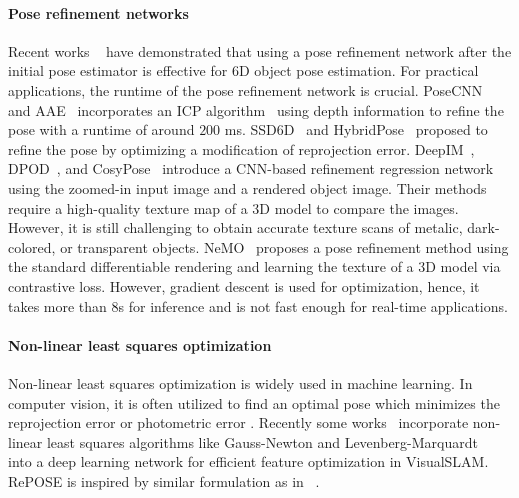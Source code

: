 \documentclass[10pt,twocolumn,letterpaper]{article}
\begin{document}
\paragraph{Pose refinement networks}
Recent works ~\cite{xiang2018posecnn,Sundermeyer_2018_ECCV,Zakharov_2019_ICCV,Song_2020_CVPR,li2018deepim} have demonstrated that using a pose refinement network after the initial pose estimator is effective for 6D object pose estimation. For practical applications, the runtime of the pose refinement network is crucial. PoseCNN~\cite{xiang2018posecnn} and AAE~\cite{Sundermeyer_2018_ECCV} incorporates an ICP algorithm~\cite{Zhang2014} using depth information to refine the pose with a runtime of around $200$ ms. SSD6D~\cite{Kehl_2017_ICCV} and HybridPose~\cite{Song_2020_CVPR} proposed to refine the pose by optimizing a modification of reprojection error. DeepIM~\cite{li2018deepim}, DPOD~\cite{Zakharov_2019_ICCV}, and CosyPose~\cite{labbe2020} introduce a CNN-based refinement regression network using the zoomed-in input image and a rendered object image. Their methods require a high-quality texture map of a 3D model to compare the images. However, it is still challenging to obtain accurate texture scans of metalic, dark-colored, or transparent objects. NeMO~\cite{wang2021nemo} proposes a pose refinement method using the standard differentiable rendering and learning the texture of a 3D model via contrastive loss. However, gradient descent is used for optimization, hence, it takes more than $8$s for inference and is not fast enough for real-time applications. 

\paragraph{Non-linear least squares optimization}
Non-linear least squares optimization is widely used in machine learning. In computer vision, it is often utilized to find an optimal pose which minimizes the reprojection error or photometric error \cite{Alismail-2016-5532,7219438,7780814}. Recently some works~\cite{Tang2019,gnnet,Clark_2018_ECCV} incorporate non-linear least squares algorithms like Gauss-Newton and Levenberg-Marquardt~\cite{10.1007/BFb0067700} into a deep learning network for efficient feature optimization in VisualSLAM\@. RePOSE is inspired by similar formulation as in ~\cite{Tang2019}.
\end{document}
